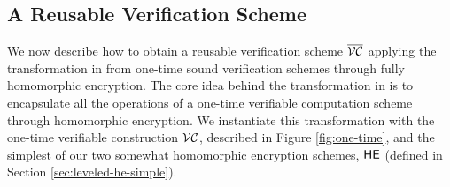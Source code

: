 
\subsection{A Reusable Verification Scheme}
\label{sec:vc-many}
We now describe how to obtain a reusable verification scheme $\overline{{\cal VC}}$ applying the transformation in \cite{ckv10} from one-time sound verification schemes through fully homomorphic encryption. The core idea behind the transformation in \cite{ckv10} is to encapsulate all the operations of a one-time verifiable computation scheme through homomorphic encryption. We instantiate this transformation with the one-time verifiable construction ${\cal VC}$, described in Figure \ref{fig:one-time}, and the simplest of our two somewhat homomorphic encryption schemes, $\mathsf{HE}$ (defined in Section \ref{sec:leveled-he-simple}). 

